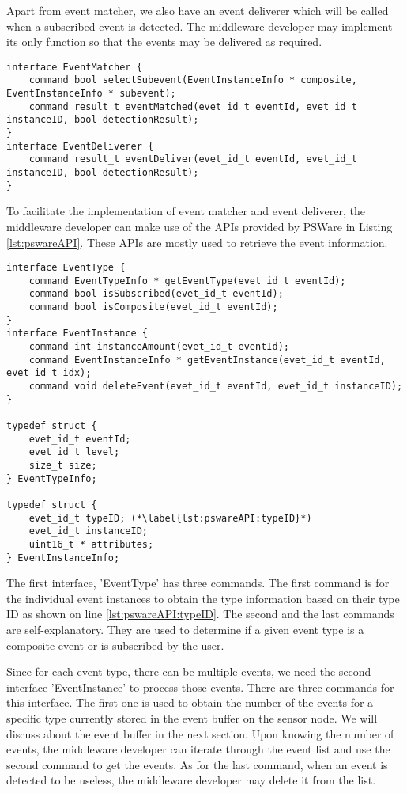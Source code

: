 Apart from event matcher, we also have an event deliverer which will be called when a subscribed event is detected. The middleware developer may implement its only function so that the events may be delivered as required.
\begin{lstlisting}[caption=The event matcher interface, label=lst:pswareEventMatcher]
interface EventMatcher {
	command bool selectSubevent(EventInstanceInfo * composite, EventInstanceInfo * subevent);
	command result_t eventMatched(evet_id_t eventId, evet_id_t instanceID, bool detectionResult);
}
interface EventDeliverer {
	command result_t eventDeliver(evet_id_t eventId, evet_id_t instanceID, bool detectionResult);
}
\end{lstlisting}

To facilitate the implementation of event matcher and event deliverer, the middleware developer can make use of the APIs provided by PSWare in Listing \ref{lst:pswareAPI}. These APIs are mostly used to retrieve the event information.
\begin{lstlisting}[caption=PSWare API in NesC, label=lst:pswareAPI]
interface EventType {
	command EventTypeInfo * getEventType(evet_id_t eventId);
	command bool isSubscribed(evet_id_t eventId);
	command bool isComposite(evet_id_t eventId);
}
interface EventInstance {
	command int instanceAmount(evet_id_t eventId);
	command EventInstanceInfo * getEventInstance(evet_id_t eventId, evet_id_t idx);
	command void deleteEvent(evet_id_t eventId, evet_id_t instanceID);
}

typedef struct {
	evet_id_t eventId;
	evet_id_t level;
	size_t size;
} EventTypeInfo;

typedef struct {
	evet_id_t typeID; (*\label{lst:pswareAPI:typeID}*)
	evet_id_t instanceID;
	uint16_t * attributes;
} EventInstanceInfo;
\end{lstlisting}

The first interface, 'EventType' has three commands. The first command is for the individual event instances to obtain the type information based on their type ID as shown on line \ref{lst:pswareAPI:typeID}. The second and the last commands are self-explanatory. They are used to determine if a given event type is a composite event or is subscribed by the user.

Since for each event type, there can be multiple events, we need the second interface 'EventInstance' to process those events. There are three commands for this interface. The first one is used to obtain the number of the events for a specific type currently stored in the event buffer on the sensor node. We will discuss about the event buffer in the next section. Upon knowing the number of events, the middleware developer can iterate through the event list and use the second command to get the events. As for the last command, when an event is detected to be useless, the middleware developer may delete it from the list.

